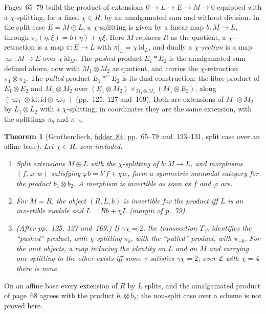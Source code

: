 \documentclass[11pt,a4paper]{amsart}
\newtheorem{theorem}{Theorem}[section]
\theoremstyle{definition}
\theoremstyle{remark}
\newcommand{\Z}{\mathbb Z}
\newcommand{\fac}[1]{\href{https://grothendieck.umontpellier.fr/#1.pdf}{folder~#1}}
\begin{document}
Pages~65--79 build the product of extensions $0 \to L \to E \to M \to 0$ equipped with a $\chi$-splitting, for a fixed $\chi \in R$, by an amalgamated sum and without division. In the split case $E = M \oplus L$, a $\chi$-splitting is given by a linear map $b\colon M \to L$, through $\pi_b(\eta, \xi) = b(\eta) + \chi\xi$. Here $M$ replaces $R$ as the quotient, a $\chi$-retraction is a map $\pi\colon E \to L$ with $\pi|_L = \chi\,\mathrm{id}_L$, and dually a \emph{$\chi$-section} is a map $\varpi\colon M \to E$ over $\chi\,\mathrm{id}_M$. The \emph{pushed} product $E_1 * E_2$ is the amalgamated sum defined above, now with $M_1 \otimes M_2$ as quotient, and carries the $\chi$-retraction $\pi_1 \otimes \pi_2$. The \emph{pulled} product $E_1 *^{\varpi} E_2$ is its dual construction: the fibre product of $E_1 \otimes E_2$ and $M_1 \otimes M_2$ over $(E_1 \otimes M_2) \times_{M_1 \otimes M_2} (M_1 \otimes E_2)$, along $(\varpi_1 \otimes \mathrm{id}, \mathrm{id} \otimes \varpi_2)$ (pp.~125, 127 and~169). Both are extensions of $M_1 \otimes M_2$ by $L_1 \otimes L_2$ with a $\chi$-splitting; in coordinates they are the same extension, with the splittings $\pi_b$ and $\pi_{-b}$.

\begin{theorem}[Grothendieck, \fac{84}, pp.~65--79 and~123--131, split case over an affine base]\label{thm:chi}
Let $\chi \in R$, zero included.
\begin{enumerate}
\item Split extensions $M \oplus L$ with the $\chi$-splitting of $b\colon M \to L$, and morphisms $(f, \varphi, w)$ satisfying $\varphi b = b'f + \chi w$, form a symmetric monoidal category for the product $b_1 \otimes b_2$. A morphism is invertible as soon as $f$ and $\varphi$ are.
\item For $M = R$, the object $(R, L, b)$ is invertible for the product iff $L$ is an invertible module and $L = Rb + \chi L$ (margin of p.~79).
\item \emph{(After pp.~125, 127 and~169.)} If $\gamma\chi = 2$, the transvection $T_{\gamma b}$ identifies the ``pushed'' product, with $\chi$-splitting $\pi_b$, with the ``pulled'' product, with $\pi_{-b}$. For the unit objects, a map inducing the identity on $L$ and on $M$ and carrying one splitting to the other exists iff some $\gamma$ satisfies $\gamma\chi = 2$; over $\Z$ with $\chi = 4$ there is none.
\end{enumerate}
\end{theorem}

On an affine base every extension of $R$ by $L$ splits, and the amalgamated product of page~68 agrees with the product $b_1 \otimes b_2$; the non-split case over a scheme is not proved here.
\end{document}
